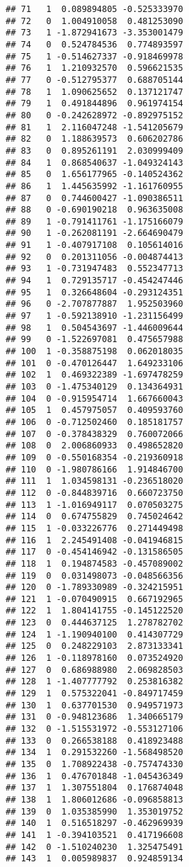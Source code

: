 \documentclass[
]{article}
\begin{document}
\begin{verbatim}
## 71   1  0.089894805 -0.525333970
## 72   0  1.004910058  0.481253090
## 73   1 -1.872941673 -3.353001479
## 74   0  0.524784536  0.774893597
## 75   1 -0.514627337 -0.918469978
## 76   1  1.210932570  0.596621535
## 77   0 -0.512795377  0.688705144
## 78   1  1.090625652  0.137121747
## 79   1  0.491844896  0.961974154
## 80   0 -0.242628972 -0.892975152
## 81   1  2.116047248 -1.541205679
## 82   0  1.188639573  0.606202786
## 83   0  0.895261191  2.030999409
## 84   1  0.868540637 -1.049324143
## 85   0  1.656177965 -0.140524362
## 86   1  1.445635992 -1.161760955
## 87   0  0.744600427 -1.090386511
## 88   0 -0.690190218  0.963635008
## 89   1 -0.791411761 -1.175166079
## 90   1 -0.262081191 -2.664690479
## 91   1 -0.407917108  0.105614016
## 92   0  0.201311056 -0.004874413
## 93   1 -0.731947483  0.552347713
## 94   1  0.729135717 -0.454247446
## 95   1  0.326648604 -0.293124351
## 96   0 -2.707877887  1.952503960
## 97   1 -0.592138910 -1.231156499
## 98   1  0.504543697 -1.446009644
## 99   0 -1.522697081  0.475657988
## 100  1 -0.358875198  0.062018035
## 101  0 -0.470126447  1.649233106
## 102  1  0.469322389 -1.697478259
## 103  0 -1.475340129  0.134364931
## 104  0 -0.915954714  1.667660043
## 105  1  0.457975057  0.409593760
## 106  0 -0.712502460  0.185181757
## 107  0 -0.378438329  0.760072066
## 108  0  2.006860933  0.498652820
## 109  0 -0.550168354 -0.219360918
## 110  0 -1.980786166  1.914846700
## 111  1  1.034598131 -0.236518020
## 112  0 -0.844839716  0.660723750
## 113  1 -1.016949117  0.070503275
## 114  0  0.674755829  0.745024642
## 115  1 -0.033226776  0.271449498
## 116  1  2.245491408 -0.041946815
## 117  0 -0.454146942 -0.131586505
## 118  1  0.194874583 -0.457089002
## 119  0  0.031498073 -0.048566356
## 120  0 -1.789330989 -0.324215951
## 121  1 -0.070490915  0.667192965
## 122  1  1.804141755 -0.145122520
## 123  0  0.444637125  1.278782702
## 124  1 -1.190940100  0.414307729
## 125  0  0.248229103  2.873133341
## 126  1 -0.118978160  0.073524920
## 127  0  0.686988980  2.069828503
## 128  1 -1.407777792  0.253816382
## 129  1  0.575322041 -0.849717459
## 130  1  0.637701530  0.949571973
## 131  0 -0.948123686  1.340665179
## 132  0 -1.515531972 -0.553127106
## 133  0  0.266538188  0.418923488
## 134  1  0.291532260 -1.568498520
## 135  0  1.708922438 -0.757474330
## 136  1  0.476701848 -1.045436349
## 137  1  1.307551804  0.176874048
## 138  1  1.806012686 -0.096858813
## 139  0  1.035385990  1.353019752
## 140  1  0.516518297 -0.462969939
## 141  1 -0.394103521  0.417196608
## 142  0 -1.510240230  1.325475491
## 143  1  0.005989837  0.924859134

\end{verbatim}
\end{document}
